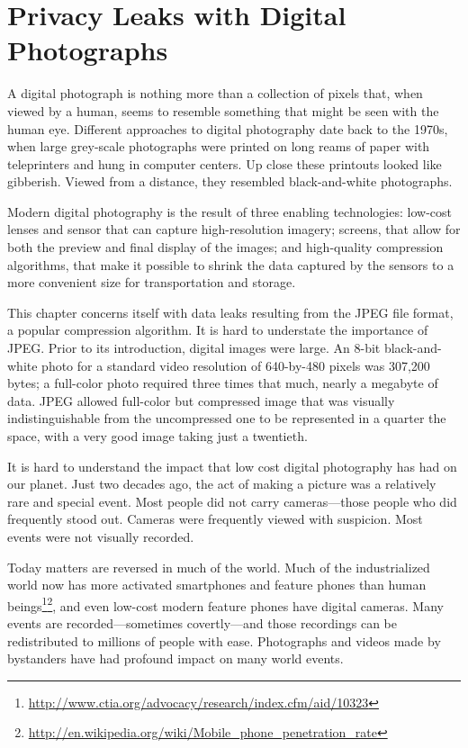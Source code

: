 \chapter{Privacy Leaks with Digital Photographs}

A digital photograph is nothing more than a collection of
pixels that, when viewed by a human, seems to resemble something that
might be seen with the human eye. Different approaches to digital
photography date back to the 1970s, when large grey-scale photographs
were printed on long reams of paper with teleprinters and hung in
computer centers. Up close these printouts looked like
gibberish. Viewed from a distance, they resembled black-and-white photographs.

Modern digital photography is the result of three enabling
technologies: low-cost lenses and sensor that can capture
high-resolution imagery; screens, that allow for both the preview and
final display of the images; and high-quality compression algorithms,
that make it possible to shrink the data captured by the sensors to a
more convenient size for transportation and storage.

This chapter concerns itself with data leaks resulting from the JPEG
file format, a popular compression algorithm. It is hard to understate
the importance of JPEG. Prior to its introduction, digital images were
large. An 8-bit black-and-white photo for a standard video resolution
of 640-by-480 pixels was 307,200 bytes; a full-color photo required
three times that much, nearly a megabyte of data. JPEG allowed
full-color but compressed image that was visually indistinguishable from the
uncompressed one to be represented in a quarter the space, with a very
good image taking just a twentieth. 


It is hard to understand the impact that low cost digital photography has had on our
planet. Just two decades ago, the act of making a picture was a
relatively rare and special event. Most people did not carry
cameras---those people who did frequently stood out. Cameras were
frequently viewed with suspicion. Most events were not visually
recorded. 

Today matters are reversed in much of the world. Much of the
industrialized world now has more activated smartphones and feature
phones than human
beings\footnote{\url{http://www.ctia.org/advocacy/research/index.cfm/aid/10323}}\footnote{\url{http://en.wikipedia.org/wiki/Mobile_phone_penetration_rate}},
and even low-cost modern feature phones have digital cameras. Many
events are recorded---sometimes covertly---and those recordings can be
redistributed to millions of people with ease. Photographs and videos
made by bystanders have had profound impact on many world events.

